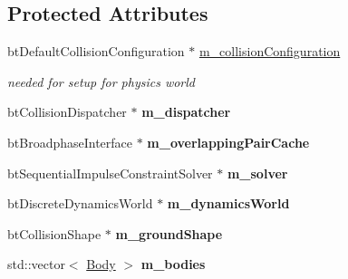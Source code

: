 \subsection*{Protected Attributes}
\begin{DoxyCompactItemize}
\item 
\hypertarget{classPhysicsWorld_a35188167a726cdd0118eff29042bd2bc}{
btDefaultCollisionConfiguration $\ast$ \hyperlink{classPhysicsWorld_a35188167a726cdd0118eff29042bd2bc}{m\_\-collisionConfiguration}}
\label{classPhysicsWorld_a35188167a726cdd0118eff29042bd2bc}

\begin{DoxyCompactList}\small\item\em needed for setup for physics world \item\end{DoxyCompactList}\item 
\hypertarget{classPhysicsWorld_aec63ab074f96cb9620fce3e11142fa90}{
btCollisionDispatcher $\ast$ {\bfseries m\_\-dispatcher}}
\label{classPhysicsWorld_aec63ab074f96cb9620fce3e11142fa90}

\item 
\hypertarget{classPhysicsWorld_a70b27b3c8e5ac9d49c988dcb10d2dbb9}{
btBroadphaseInterface $\ast$ {\bfseries m\_\-overlappingPairCache}}
\label{classPhysicsWorld_a70b27b3c8e5ac9d49c988dcb10d2dbb9}

\item 
\hypertarget{classPhysicsWorld_ada66c07b62f4d0d302b5db3630148984}{
btSequentialImpulseConstraintSolver $\ast$ {\bfseries m\_\-solver}}
\label{classPhysicsWorld_ada66c07b62f4d0d302b5db3630148984}

\item 
\hypertarget{classPhysicsWorld_a258646d396900c8fc301d4ec7090cfa2}{
btDiscreteDynamicsWorld $\ast$ {\bfseries m\_\-dynamicsWorld}}
\label{classPhysicsWorld_a258646d396900c8fc301d4ec7090cfa2}

\item 
\hypertarget{classPhysicsWorld_a8ca5d5cfae3ab66acc40bb705d1a955b}{
btCollisionShape $\ast$ {\bfseries m\_\-groundShape}}
\label{classPhysicsWorld_a8ca5d5cfae3ab66acc40bb705d1a955b}

\item 
\hypertarget{classPhysicsWorld_a31f6f65ace404661cc9954580fe3c64d}{
std::vector$<$ \hyperlink{structPhysicsWorld_1_1Body}{Body} $>$ {\bfseries m\_\-bodies}}
\label{classPhysicsWorld_a31f6f65ace404661cc9954580fe3c64d}

\end{DoxyCompactItemize}


